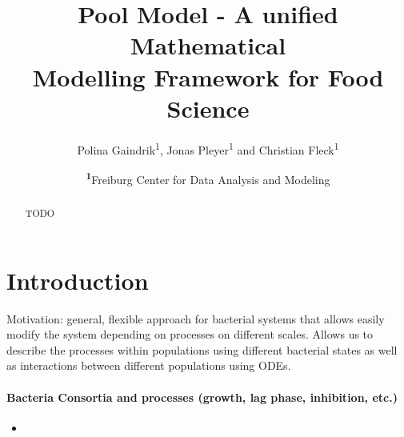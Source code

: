 \documentclass[10pt,A4paper]{article}
\title{Pool Model - A unified Mathematical\\ Modelling Framework for Food Science}
\author{
    Polina Gaindrik\textsuperscript{1},
    Jonas Pleyer\textsuperscript{1}
    and Christian Fleck\textsuperscript{1}
}
\date{
    \footnotesize
    \textsuperscript{\textbf{1}}Freiburg Center for Data Analysis and Modeling
}
\numberwithin{equation}{section}
\begin{document}
\maketitle

\begin{abstract}
    TODO
\end{abstract}

\newpage
\tableofcontents

\twocolumn

\newpage
%
%
%
%
\section{Introduction}
Motivation: general, flexible approach for bacterial systems that allows easily modify the system depending on processes on different scales.
Allows us to describe the processes within populations using different bacterial states as well as interactions between different populations using ODEs.

\paragraph{Bacteria Consortia and processes (growth, lag phase, inhibition, etc.)}
\begin{itemize}
    \item 
\end{itemize}

\noindent
\end{document}
